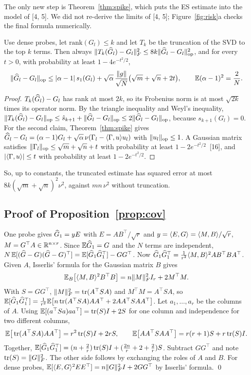 The only new step is Theorem~\ref{thm:spike}, which puts the ES estimate into the model of [4, 5]. We did not re-derive the limits of [4, 5]; Figure~\ref{fig:risk}a checks the final formula numerically.

\begin{proposition}[Finite $N$]\label{prop:finite}
Use dense probes, let $\mathrm{rank}(G_l)\le k$ and let $T_k$ be the truncation of the SVD to the top $k$ terms. Then always $\|T_k(\widehat G_l)-G_l\|_F^2\le8k\|\widehat G_l-G_l\|_{\mathrm{op}}^2$, and for every $t>0$, with probability at least $1-4e^{-t^2/2}$,
\[
\|\widehat G_l-G_l\|_{\mathrm{op}}\le|\alpha-1|\,s_1(G_l)+\sqrt\alpha\,\frac{\|g\|}{\sqrt N}\big(\sqrt{m}+\sqrt{n}+2t\big),\qquad\mathbb{E}(\alpha-1)^2=\frac2N .
\]
\end{proposition}
\begin{proof}
$T_k(\widehat G_l)-G_l$ has rank at most $2k$, so its Frobenius norm is at most $\sqrt{2k}$ times its operator norm. By the triangle inequality and Weyl's inequality, $\|T_k(\widehat G_l)-G_l\|_{\mathrm{op}}\le\hat s_{k+1}+\|\widehat G_l-G_l\|_{\mathrm{op}}\le2\|\widehat G_l-G_l\|_{\mathrm{op}}$, because $s_{k+1}(G_l)=0$. For the second claim, Theorem~\ref{thm:spike} gives $\widehat G_l-G_l=(\alpha-1)G_l+\sqrt\alpha\,\nu(\Gamma_l-\langle \Gamma,u\rangle u_l)$ with $\|u_l\|_{\mathrm{op}}\le1$. A Gaussian matrix satisfies $\|\Gamma_l\|_{\mathrm{op}}\le\sqrt m+\sqrt n+t$ with probability at least $1-2e^{-t^2/2}$~[16], and $|\langle \Gamma,u\rangle|\le t$ with probability at least $1-2e^{-t^2/2}$.
\end{proof}
So, up to constants, the truncated estimate has squared error at most $8k(\sqrt m+\sqrt n)^2\nu^2$, against $mn\,\nu^2$ without truncation.

\subsection{Proof of Proposition~\ref{prop:cov}}
One probe gives $\widehat G_1=yE$ with $E=AB^\top/\sqrt r$ and $y=\langle E,G\rangle=\langle M,B\rangle/\sqrt r$, $M=G^\top A\in\mathbb{R}^{n\times r}$. Since $\mathbb{E}\widehat G_1=G$ and the $N$ terms are independent, $N\,\mathbb{E}[(\widehat G-G)(\widehat G-G)^\top]=\mathbb{E}[\widehat G_1\widehat G_1^\top]-GG^\top$. Now $\widehat G_1\widehat G_1^\top=\frac1{r^2}\langle M,B\rangle^2AB^\top BA^\top$. Given $A$, Isserlis' formula for the Gaussian matrix $B$ gives
\[
\mathbb{E}_B\big[\langle M,B\rangle^2B^\top B\big]=n\|M\|_F^2I_r+2M^\top M .
\]
With $S=GG^\top$, $\|M\|_F^2=\operatorname{tr}(A^\top SA)$ and $M^\top M=A^\top SA$, so $\mathbb{E}[\widehat G_1\widehat G_1^\top]=\frac1{r^2}\mathbb{E}\big[n\operatorname{tr}(A^\top SA)AA^\top+2AA^\top SAA^\top\big]$. Let $a_1,\dots,a_r$ be the columns of $A$. Using $\mathbb{E}[(a^\top Sa)aa^\top]=\operatorname{tr}(S)I+2S$ for one column and independence for two different columns,
\[
\mathbb{E}\big[\operatorname{tr}(A^\top SA)AA^\top\big]=r^2\operatorname{tr}(S)I+2rS,\qquad\mathbb{E}\big[AA^\top SAA^\top\big]=r(r+1)S+r\operatorname{tr}(S)I .
\]
Together, $\mathbb{E}[\widehat G_1\widehat G_1^\top]=(n+\frac2r)\operatorname{tr}(S)I+(\frac{2n}r+2+\frac2r)S$. Subtract $GG^\top$ and note $\operatorname{tr}(S)=\|G\|_F^2$. The other side follows by exchanging the roles of $A$ and $B$. For dense probes, $\mathbb{E}[\langle E,G\rangle^2EE^\top]=n\|G\|_F^2I+2GG^\top$ by Isserlis' formula. \qed


